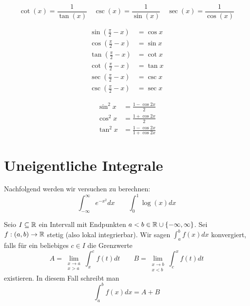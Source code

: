\documentclass[main.tex]{subfiles}
\begin{document}
\begin{Theorem}[Reziprokenidentität]
  $$\cot (x) = \dfrac{1}{\tan (x)} \quad \csc (x) = \dfrac{1}{\sin (x)} \quad \sec (x) = \dfrac{1}{\cos (x)}$$
\end{Theorem}

\begin{Theorem}[Kofunktionsidentität]
  $$\begin{aligned}
    \sin \left(\frac{\pi}{2} - x\right) &= \cos x\\
    \cos \left(\frac{\pi}{2} - x\right) &= \sin x\\
    \tan \left(\frac{\pi}{2} - x\right) &= \cot x\\
    \cot \left(\frac{\pi}{2} - x\right) &= \tan x\\
    \sec \left(\frac{\pi}{2} - x\right) &= \csc x\\
    \csc \left(\frac{\pi}{2} - x\right) &= \sec x
  \end{aligned}$$
\end{Theorem}

\begin{Theorem}[Potenzverringerungsidentität]
  $$\begin{aligned}
    \sin^2 x  &= \frac{1 - \cos 2x}{2}\\
    \cos^2 x  &= \frac{1 + \cos 2x}{2}\\
    \tan^2 x  &= \frac{1 - \cos 2x}{1 + \cos 2x}
  \end{aligned}$$
\end{Theorem}


\section{Uneigentliche Integrale}

Nachfolgend werden wir versuchen zu berechnen:
$$\int_{-\infty}^\infty e^{{-x}^2} dx \qquad \int_0^1 \log(x)dx$$

\begin{Definition}
  Seio $I \subseteq \mathbb{R}$ ein Intervall mit Endpunkten $a < b \in \mathbb{R} \cup \{-\infty,\infty\}$. Sei $f: (a,b) \to \mathbb{R}$ stetig (also lokal integrierbar). Wir sagen $\int_a^b f(x)dx$ konvergiert, falls für ein beliebiges $c \in I$ die Grenzwerte
  $$A = \lim \limits_{\substack{x \to a \\ x > a}} \int_x^c f(t)dt \qquad B = \lim \limits_{\substack{x \to b \\ x < b}} \int_c^x f(t)dt$$
  existieren.
  In diesem Fall schreibt man
  $$\int_a^b f(x)dx = A + B$$
\end{Definition}
\end{document}
